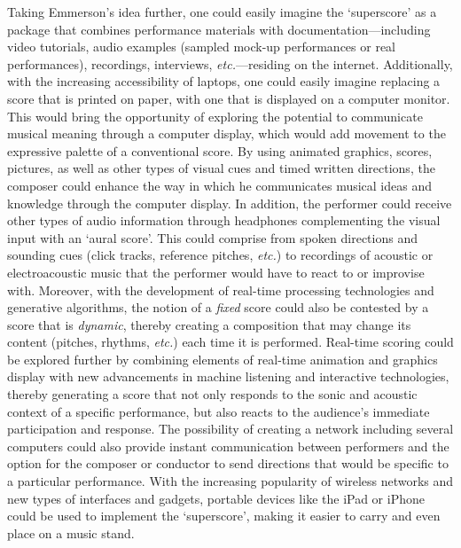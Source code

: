 Taking Emmerson's idea further, one could easily imagine the `superscore' as a package that combines performance materials with documentation---including video tutorials, audio examples (sampled mock-up performances or real performances), recordings, interviews, \emph{etc.}---residing on the internet. Additionally, with the increasing accessibility of laptops, one could easily imagine replacing a score that is printed on paper, with one that is displayed on a computer monitor. This would bring the opportunity of exploring the potential to communicate musical meaning through a computer display, which would add movement to the expressive palette of a conventional score. By using animated graphics, scores, pictures, as well as other types of visual cues and timed written directions, the composer could enhance the way in which he communicates musical ideas and knowledge through the computer display. In addition, the performer could receive other types of audio information through headphones complementing the visual input with an `aural score'. This could comprise from spoken directions and sounding cues (click tracks, reference pitches,  \emph{etc.}) to recordings of acoustic or electroacoustic music that the performer would have to react to or improvise with. Moreover, with the development of real-time processing technologies and generative algorithms, the notion of a \emph{fixed} score could also be contested by a score that is \emph{dynamic}, thereby creating a composition that may change its content (pitches, rhythms, \emph{etc.}) each time it is performed. Real-time scoring could be explored further by combining elements of real-time animation and graphics display with new advancements in machine listening and interactive technologies, thereby generating a score that not only responds to the sonic and acoustic context of a specific performance, but also reacts to the audience's immediate participation and response. The possibility of creating a network including several computers could also provide instant communication between performers and the option for the composer or conductor to send directions that would be specific to a particular performance. With the increasing popularity of wireless networks and new types of interfaces and gadgets, portable devices like the iPad or iPhone could be used to implement the `superscore', making it easier to carry and even place on a music stand. 

